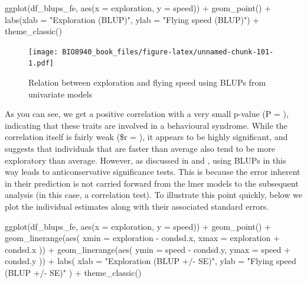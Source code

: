 \documentclass[
  12pt,
]{book}
\newenvironment{Shaded}{\begin{snugshade}}{\end{snugshade}}
\newcommand{\AttributeTok}[1]{\textcolor[rgb]{0.77,0.63,0.00}{#1}}
\newcommand{\FunctionTok}[1]{\textcolor[rgb]{0.00,0.00,0.00}{#1}}
\newcommand{\NormalTok}[1]{#1}
\newcommand{\SpecialCharTok}[1]{\textcolor[rgb]{0.00,0.00,0.00}{#1}}
\newcommand{\StringTok}[1]{\textcolor[rgb]{0.31,0.60,0.02}{#1}}
\begin{document}
\begin{Shaded}
\begin{Highlighting}[]
\FunctionTok{ggplot}\NormalTok{(df\_blups\_fe, }\FunctionTok{aes}\NormalTok{(}\AttributeTok{x =}\NormalTok{ exploration, }\AttributeTok{y =}\NormalTok{ speed)) }\SpecialCharTok{+}
  \FunctionTok{geom\_point}\NormalTok{() }\SpecialCharTok{+}
  \FunctionTok{labs}\NormalTok{(}\AttributeTok{xlab =} \StringTok{"Exploration (BLUP)"}\NormalTok{, }\AttributeTok{ylab =} \StringTok{"Flying speed (BLUP)"}\NormalTok{) }\SpecialCharTok{+}
  \FunctionTok{theme\_classic}\NormalTok{()}
\end{Highlighting}
\end{Shaded}

\begin{figure}
\centering
\texttt{[image: BIO8940\_book\_files/figure-latex/unnamed-chunk-101-1.pdf]}
\caption{\label{fig:unnamed-chunk-101}Relation between exploration and flying speed using BLUPs from univariate models}
\end{figure}

As you can see, we get a positive correlation with a very small p-value (P = ), indicating that these traits are involved in a behavioural syndrome. While the correlation itself is fairly weak (\$r = ), it appears to be highly significant, and suggests that individuals that are faster than average also tend to be more exploratory than average.
However, as discussed in \citet{hadfield_misuse_2010} and \citet{houslay_avoiding_2017}, using BLUPs in this way leads to anticonservative significance tests. This is because the error inherent in their prediction is not carried forward from the lmer models to the subsequent analysis (in this case, a correlation test).
To illustrate this point quickly, below we plot the individual estimates along with their associated standard errors.

\begin{Shaded}
\begin{Highlighting}[]
\FunctionTok{ggplot}\NormalTok{(df\_blups\_fe, }\FunctionTok{aes}\NormalTok{(}\AttributeTok{x =}\NormalTok{ exploration, }\AttributeTok{y =}\NormalTok{ speed)) }\SpecialCharTok{+}
  \FunctionTok{geom\_point}\NormalTok{() }\SpecialCharTok{+}
  \FunctionTok{geom\_linerange}\NormalTok{(}\FunctionTok{aes}\NormalTok{(}
    \AttributeTok{xmin =}\NormalTok{ exploration }\SpecialCharTok{{-}}\NormalTok{ condsd.x,}
    \AttributeTok{xmax =}\NormalTok{ exploration }\SpecialCharTok{+}\NormalTok{ condsd.x}
\NormalTok{  )) }\SpecialCharTok{+}
  \FunctionTok{geom\_linerange}\NormalTok{(}\FunctionTok{aes}\NormalTok{(}
    \AttributeTok{ymin =}\NormalTok{ speed }\SpecialCharTok{{-}}\NormalTok{ condsd.y,}
    \AttributeTok{ymax =}\NormalTok{ speed }\SpecialCharTok{+}\NormalTok{ condsd.y}
\NormalTok{  )) }\SpecialCharTok{+}
  \FunctionTok{labs}\NormalTok{(}
    \AttributeTok{xlab =} \StringTok{"Exploration (BLUP +/{-} SE)"}\NormalTok{,}
    \AttributeTok{ylab =} \StringTok{"Flying speed (BLUP +/{-} SE)"}
\NormalTok{  ) }\SpecialCharTok{+}
  \FunctionTok{theme\_classic}\NormalTok{()}
\end{Highlighting}
\end{Shaded}
\end{document}
